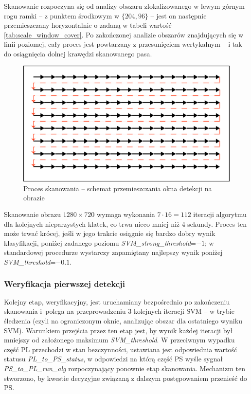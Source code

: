 Skanowanie rozpoczyna się od analizy obszaru zlokalizowanego w lewym górnym rogu ramki -- z punktem środkowym w $\{204,96\}$ -- jest on następnie przemieszczany horyzontalnie o zadaną w tabeli wartość \ref{tab:scale_window_cover}. 
Po zakończonej analizie obszarów znajdujących się w linii poziomej, cały proces jest powtarzany z przesunięciem wertykalnym -- i tak do osiągnięcia dolnej krawędzi skanowanego pasa. 
\begin{figure}[h]
	\centering
	\includegraphics[width=12cm]{6_scanning.jpg}
	\caption{Proces skanowania -- schemat przemieszczania okna detekcji na obrazie}
	\label{fig:scan_scheme}
\end{figure}
Skanowanie obrazu $1280\times 720$ wymaga wykonania $7\cdot16=112$ iteracji algorytmu dla kolejnych nieparzystych klatek, co trwa nieco mniej niż 4 sekundy. 
Proces ten może trwać krócej, jeśli w jego trakcie osiągnie się bardzo dobry wynik klasyfikacji, poniżej zadanego poziomu \textit{SVM\_strong\_threshold}=$-1$; w standardowej procedurze wystarczy zapamiętany najlepszy wynik poniżej \textit{SVM\_threshold}=$-0.1$.


\subsubsection{Weryfikacja pierwszej detekcji}

Kolejny etap, weryfikacyjny, jest uruchamiany bezpośrednio po zakończeniu skanowania i~polega na przeprowadzeniu 3 kolejnych iteracji SVM -- w trybie śledzenia (czyli na ograniczonym oknie, analizując obszar dla ostatniego wyniku SVM). 
Warunkiem przejścia przez ten etap jest, by wynik każdej iteracji był mniejszy od założonego maksimum \textit{SVM\_threshold}. 
W przeciwnym wypadku część PL przechodzi w stan bezczynności, ustawiana jest odpowiednia wartość statusu \textit{PL\_to\_PS\_status}, w odpowiedzi na którą część PS wyśle sygnał \textit{PS\_to\_PL\_run\_alg} rozpoczynający ponownie etap skanowania. 
Mechanizm ten stworzono, by kwestie decyzyjne związaną z dalszym postępowaniem przenieść do PS.


